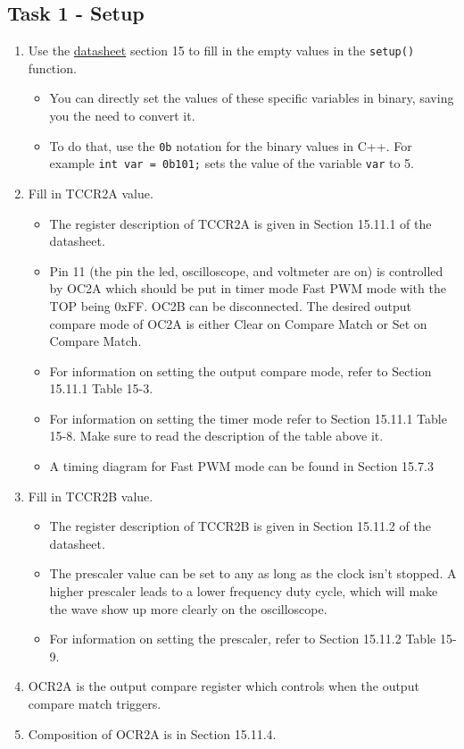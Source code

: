 \documentclass{article}
\begin{document}
    \subsection{Task 1 - Setup}
        \begin{enumerate}
            \item Use the \href{https://www.sparkfun.com/datasheets/Components/SMD/ATMega328.pdf}{datasheet} section 15 to fill in the empty values in the \texttt{setup()} function.
            \begin{itemize}
                \item You can directly set the values of these specific variables in binary, saving you the need to convert it.
                \item To do that, use the \texttt{0b} notation for the binary values in C++. For example \texttt{int var = 0b101;} sets the value of the variable \texttt{var} to 5.
            \end{itemize}
            \item Fill in TCCR2A value.
            \begin{itemize}
                \item The register description of TCCR2A is given in Section 15.11.1 of the datasheet.
                \item Pin 11 (the pin the led, oscilloscope, and voltmeter are on) is controlled by OC2A which should be put in timer mode Fast PWM mode with the TOP being 0xFF. OC2B can be disconnected. The desired output compare mode of OC2A is either Clear on Compare Match or Set on Compare Match.
                \item For information on setting the output compare mode, refer to Section 15.11.1 Table 15-3.
                \item For information on setting the timer mode refer to Section 15.11.1 Table 15-8. Make sure to read the description of the table above it.
                \item A timing diagram for Fast PWM mode can be found in Section 15.7.3
            \end{itemize}
            \item Fill in TCCR2B value.
            \begin{itemize}
                \item The register description of TCCR2B is given in Section 15.11.2 of the datasheet.
                \item The prescaler value can be set to any as long as the clock isn't stopped. A higher prescaler leads to a lower frequency duty cycle, which will make the wave show up more clearly on the oscilloscope.
                \item For information on setting the prescaler, refer to Section 15.11.2 Table 15-9.
            \end{itemize}
             \item OCR2A is the output compare register which controls when the output compare match triggers.
             \item Composition of OCR2A is in Section 15.11.4.
        \end{enumerate}
\end{document}
